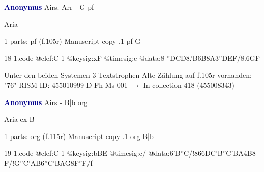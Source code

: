 \documentclass[twocolumn]{book}
\begin{document}
\newline \par \vspace{7pt} \textcolor{darkblue}{\textbf{Anonymus  }}
\newline Airs. Arr - G
\newline pf
\newline \begin{itshape} Aria\end{itshape} 
\newline \textcolor{darkblue}{}  1 parts: pf  (f.105r)
\newline Manuscript copy
.1  pf  G  
\begin{filecontents*}{18-1.code}
@clef:C-1
@keysig:xF
@timesig:c
@data:8-''D{CD}{8.'B6B}8A{3''DEF}/{8.6GF}
\end{filecontents*}
\newline
%

\newline Unter den beiden Systemen 3 Textstrophen
\newline Alte Zählung auf f.105r vorhanden: "76"
\newline RISM-ID: 455010999
\newline D-Fh  Ms 001
\newline $\rightarrow$ In collection 418 (455008343)
      
\newline \par \vspace{7pt} \textcolor{darkblue}{\textbf{Anonymus  }}
\newline Airs - B|b
\newline org
\newline \begin{itshape}[f.115r, heading:] Aria ex B\end{itshape} 
\newline \textcolor{darkblue}{}  1 parts: org  (f.115r)
\newline Manuscript copy
.1  org  B|b  
\begin{filecontents*}{19-1.code}
@clef:C-1
@keysig:bBE
@timesig:c/
@data:{6'B''C}/!{866DC'B}{''C'BA}4B8-F/!{G''C}{'AB}{6''C'BAG}{8F''F}/f
\end{filecontents*}
\newline
%
\end{document}
